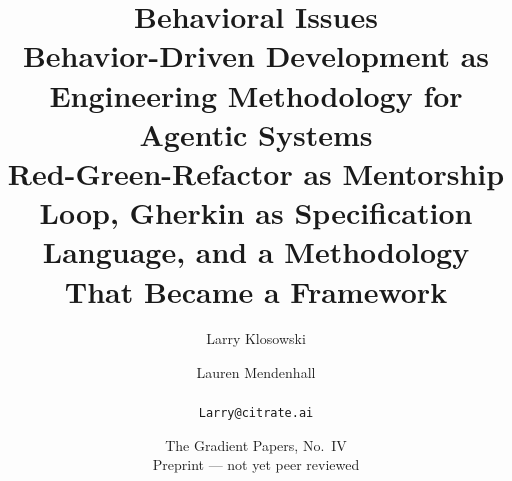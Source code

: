 
\title{\textbf{Behavioral Issues}\\[3pt]
\large Behavior-Driven Development as Engineering Methodology for Agentic Systems\\[2pt]
\normalsize Red-Green-Refactor as Mentorship Loop, Gherkin as Specification Language, and a Methodology That Became a Framework}
\author{Larry Klosowski \and Lauren Mendenhall\\[2pt]\CitrateAffil\\ \texttt{Larry@citrate.ai}}
\date{The Gradient Papers, No.~IV \\ Preprint --- not yet peer reviewed}
\maketitle
